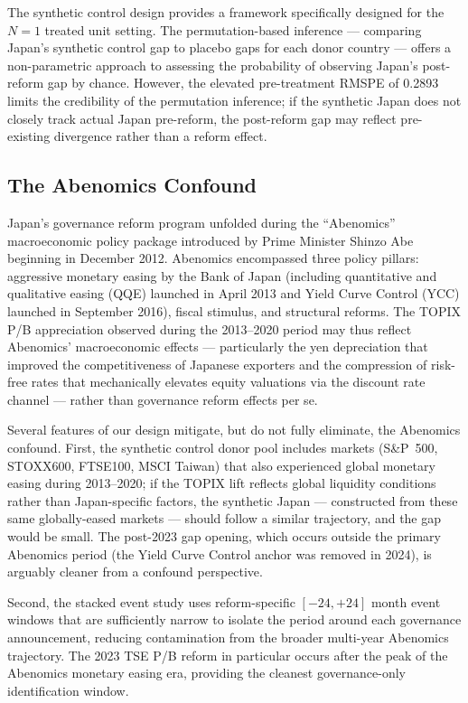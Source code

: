\documentclass[12pt]{article}
\begin{document}
The synthetic control design \citep{abadie2010} provides a framework specifically designed
for the $N = 1$ treated unit setting. The permutation-based inference --- comparing Japan's
synthetic control gap to placebo gaps for each donor country --- offers a non-parametric
approach to assessing the probability of observing Japan's post-reform gap by chance.
However, the elevated pre-treatment RMSPE of 0.2893 limits the credibility of the permutation
inference; if the synthetic Japan does not closely track actual Japan pre-reform, the
post-reform gap may reflect pre-existing divergence rather than a reform effect.

\subsection{The Abenomics Confound}

Japan's governance reform program unfolded during the ``Abenomics'' macroeconomic policy
package introduced by Prime Minister Shinzo Abe beginning in December 2012. Abenomics
encompassed three policy pillars: aggressive monetary easing by the Bank of Japan (including
quantitative and qualitative easing (QQE) launched in April 2013 and Yield Curve Control
(YCC) launched in September 2016), fiscal stimulus, and structural reforms. The TOPIX P/B
appreciation observed during the 2013--2020 period may thus reflect Abenomics' macroeconomic
effects --- particularly the yen depreciation that improved the competitiveness of Japanese
exporters and the compression of risk-free rates that mechanically elevates equity valuations
via the discount rate channel --- rather than governance reform effects per se.

Several features of our design mitigate, but do not fully eliminate, the Abenomics confound.
First, the synthetic control donor pool includes markets (S\&P~500, STOXX600, FTSE100,
MSCI Taiwan) that also experienced global monetary easing during 2013--2020; if the TOPIX
lift reflects global liquidity conditions rather than Japan-specific factors, the synthetic
Japan --- constructed from these same globally-eased markets --- should follow a similar
trajectory, and the gap would be small. The post-2023 gap opening, which occurs outside the
primary Abenomics period (the Yield Curve Control anchor was removed in 2024), is arguably
cleaner from a confound perspective.

Second, the stacked event study uses reform-specific $[-24, +24]$ month event windows that
are sufficiently narrow to isolate the period around each governance announcement, reducing
contamination from the broader multi-year Abenomics trajectory. The 2023 TSE P/B reform
in particular occurs after the peak of the Abenomics monetary easing era, providing the
cleanest governance-only identification window.
\end{document}
